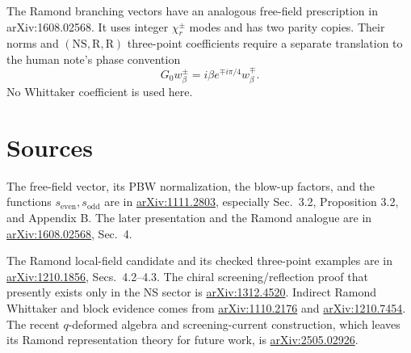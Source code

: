 \documentclass[11pt]{article}
\newcommand{\se}{s_{\mathrm{even}}}
\newcommand{\so}{s_{\mathrm{odd}}}
\begin{document}
The Ramond branching vectors have an analogous free-field prescription in
arXiv:1608.02568.  It uses integer \(\chi_r^\pm\) modes and has two parity
copies.  Their norms and \((\mathrm{NS},\mathrm R,\mathrm R)\) three-point
coefficients require a separate translation to the human note's phase
convention
\begin{equation}
 G_0w_\beta^\pm=i\beta e^{\mp i\pi/4}w_\beta^\mp.
\end{equation}
No Whittaker coefficient is used here.

\section{Sources}

The free-field vector, its PBW normalization, the blow-up factors, and the
functions \(\se,\so\) are in
\href{https://arxiv.org/abs/1111.2803}{arXiv:1111.2803}, especially
Sec.~3.2, Proposition 3.2, and Appendix B.  The later presentation and the
Ramond analogue are in
\href{https://arxiv.org/abs/1608.02568}{arXiv:1608.02568}, Sec.~4.

The Ramond local-field candidate and its checked three-point examples are in
\href{https://arxiv.org/abs/1210.1856}{arXiv:1210.1856}, Secs.~4.2--4.3.
The chiral screening/reflection proof that presently exists only in the NS
sector is
\href{https://arxiv.org/abs/1312.4520}{arXiv:1312.4520}.  Indirect Ramond
Whittaker and block evidence comes from
\href{https://arxiv.org/abs/1110.2176}{arXiv:1110.2176} and
\href{https://arxiv.org/abs/1210.7454}{arXiv:1210.7454}.  The recent
\(q\)-deformed algebra and screening-current construction, which leaves its
Ramond representation theory for future work, is
\href{https://arxiv.org/abs/2505.02926}{arXiv:2505.02926}.
\end{document}
